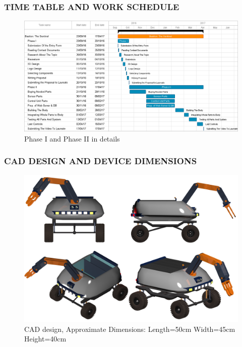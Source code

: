 \documentclass{beamer}
\begin{document}
 \begin{frame}
  \frametitle{TIME TABLE AND WORK SCHEDULE}
  \begin{figure}[h]
    \begin{center}
      \includegraphics[scale=0.27]{time_schedule}
      \caption{Phase I and Phase II in details}
    \end{center}
   \end{figure}
 \end{frame}

 \begin{frame}
  \frametitle{CAD DESIGN AND DEVICE DIMENSIONS}
  \begin{figure}[h!]
   \begin{center}
    \includegraphics[scale=0.12]{cad_design}
    \caption{CAD design, Approximate Dimensions: Length=50cm Width=45cm Height=40cm}
   \end{center}
  \end{figure}
 \end{frame}
 
\end{document}
